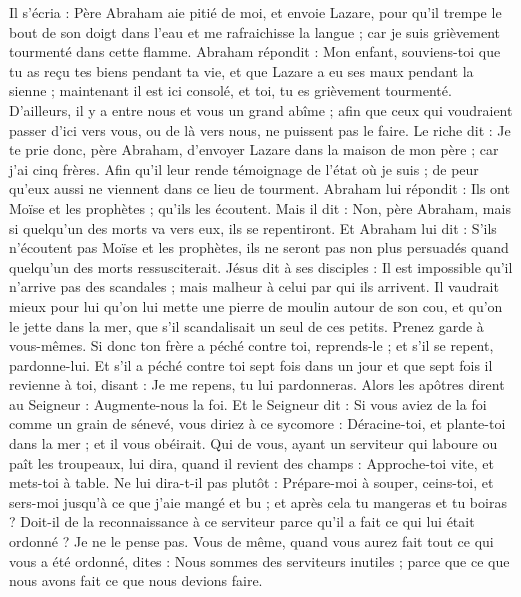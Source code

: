 \begin{multicols}{2}
Il s’écria : Père Abraham aie pitié de moi, et envoie Lazare, pour qu’il trempe le bout de son doigt dans l’eau et me rafraichisse la langue ; car je suis grièvement tourmenté dans cette flamme.
Abraham répondit : Mon enfant, souviens-toi que tu as reçu tes biens pendant ta vie, et que Lazare a eu ses maux pendant la sienne ; maintenant il est ici consolé, et toi, tu es grièvement tourmenté.
D’ailleurs, il y a entre nous et vous un grand abîme ; afin que ceux qui voudraient passer d'ici vers vous, ou de là vers nous, ne puissent pas le faire.
Le riche dit : Je te prie donc, père Abraham, d’envoyer Lazare dans la maison de mon père ; car j’ai cinq frères.
Afin qu'il leur rende témoignage de l'état où je suis ; de peur qu'eux aussi ne viennent dans ce lieu de tourment.
Abraham lui répondit : Ils ont Moïse et les prophètes ; qu'ils les écoutent.
Mais il dit : Non, père Abraham, mais si quelqu'un des morts va vers eux, ils se repentiront.
Et Abraham lui dit : S’ils n'écoutent pas Moïse et les prophètes, ils ne seront pas non plus persuadés quand quelqu'un des morts ressusciterait.
\VerseOne{}Jésus dit à ses disciples : Il est impossible qu'il n'arrive pas des scandales ; mais malheur à celui par qui ils arrivent.
Il vaudrait mieux pour lui qu'on lui mette une pierre de moulin autour de son cou, et qu’on le jette dans la mer, que s’il scandalisait un seul de ces petits.
Prenez garde à vous-mêmes. Si donc ton frère a péché contre toi, reprends-le ; et s'il se repent, pardonne-lui.
Et s’il a péché contre toi sept fois dans un jour et que sept fois il revienne à toi, disant : Je me repens, tu lui pardonneras.
Alors les apôtres dirent au Seigneur : Augmente-nous la foi.
Et le Seigneur dit : Si vous aviez de la foi comme un grain de sénevé, vous diriez à ce sycomore : Déracine-toi, et plante-toi dans la mer ; et il vous obéirait.
Qui de vous, ayant un serviteur qui laboure ou paît les troupeaux, lui dira, quand il revient des champs : Approche-toi vite, et mets-toi à table.
Ne lui dira-t-il pas plutôt : Prépare-moi à souper, ceins-toi, et sers-moi jusqu'à ce que j'aie mangé et bu ; et après cela tu mangeras et tu boiras ?
Doit-il de la reconnaissance à ce serviteur parce qu’il a fait ce qui lui était ordonné ? Je ne le pense pas.
Vous de même, quand vous aurez fait tout ce qui vous a été ordonné, dites : Nous sommes des serviteurs inutiles ; parce que ce que nous avons fait ce que nous devions faire.

\end{multicols}
